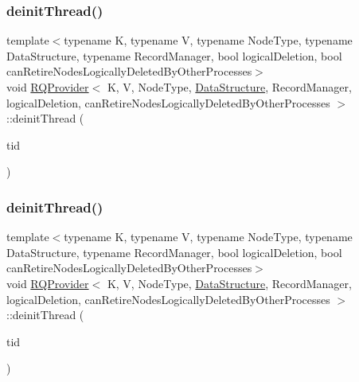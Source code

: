 \mbox{\label{classRQProvider_a3f20b96dfa5a47d9f59ada98e3322695}} 
\subsubsection{\texorpdfstring{deinit\+Thread()}{deinitThread()}\hspace{0.1cm}{\footnotesize\ttfamily [1/5]}}
{\footnotesize\ttfamily template$<$typename K, typename V, typename Node\+Type, typename Data\+Structure, typename Record\+Manager, bool logical\+Deletion, bool can\+Retire\+Nodes\+Logically\+Deleted\+By\+Other\+Processes$>$ \\
void \hyperlink{classRQProvider}{R\+Q\+Provider}$<$ K, V, Node\+Type, \hyperlink{classDataStructure}{Data\+Structure}, Record\+Manager, logical\+Deletion, can\+Retire\+Nodes\+Logically\+Deleted\+By\+Other\+Processes $>$\+::deinit\+Thread (\begin{DoxyParamCaption}\item[{const int}]{tid }\end{DoxyParamCaption})\hspace{0.3cm}{\ttfamily [inline]}}

\mbox{\label{classRQProvider_a3f20b96dfa5a47d9f59ada98e3322695}} 
\subsubsection{\texorpdfstring{deinit\+Thread()}{deinitThread()}\hspace{0.1cm}{\footnotesize\ttfamily [2/5]}}
{\footnotesize\ttfamily template$<$typename K, typename V, typename Node\+Type, typename Data\+Structure, typename Record\+Manager, bool logical\+Deletion, bool can\+Retire\+Nodes\+Logically\+Deleted\+By\+Other\+Processes$>$ \\
void \hyperlink{classRQProvider}{R\+Q\+Provider}$<$ K, V, Node\+Type, \hyperlink{classDataStructure}{Data\+Structure}, Record\+Manager, logical\+Deletion, can\+Retire\+Nodes\+Logically\+Deleted\+By\+Other\+Processes $>$\+::deinit\+Thread (\begin{DoxyParamCaption}\item[{const int}]{tid }\end{DoxyParamCaption})\hspace{0.3cm}{\ttfamily [inline]}}

